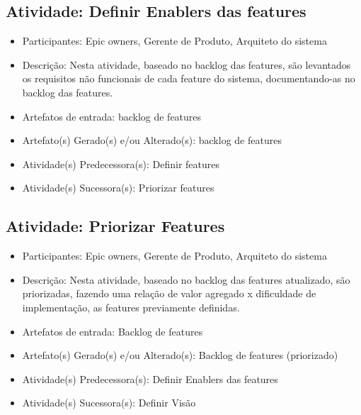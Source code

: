\subsection{Atividade: Definir Enablers das features}
\begin{itemize}
\item Participantes: Epic owners, Gerente de Produto, Arquiteto do sistema

\item Descrição: Nesta atividade, baseado no backlog das features, são levantados os requisitos não funcionais de cada feature do sistema, documentando-as no backlog das features.

\item Artefatos de entrada: backlog de features

\item Artefato(s) Gerado(s) e/ou Alterado(s): backlog de features

\item Atividade(s) Predecessora(s): Definir features
  
\item Atividade(s) Sucessora(s): Priorizar features
\end{itemize}


\subsection{Atividade: Priorizar Features}
\begin{itemize}
\item Participantes: Epic owners, Gerente de Produto, Arquiteto do sistema

\item Descrição: Nesta atividade, baseado no backlog das features atualizado, são priorizadas, fazendo uma relação de valor agregado x dificuldade de implementação, as features previamente definidas.

\item Artefatos de entrada: Backlog de features

\item Artefato(s) Gerado(s) e/ou Alterado(s): Backlog de features (priorizado)

\item Atividade(s) Predecessora(s): Definir Enablers das features
  
\item Atividade(s) Sucessora(s): Definir Visão
\end{itemize}


